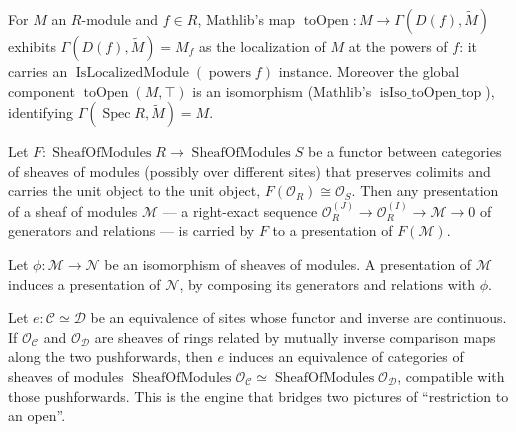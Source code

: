 \begin{lemma}
  \label{mk-lem:tilde_toOpen_isLocalizedModule_mathlib}
  \mathlibok

  For \(M\) an \(R\)-module and \(f \in R\), Mathlib's map
  \(\operatorname{toOpen} : M \to \Gamma(D(f), \widetilde{M})\) exhibits \(\Gamma(D(f), \widetilde{M}) =
  M_f\) as the localization of \(M\) at the powers of \(f\): it carries an
  \(\operatorname{IsLocalizedModule}(\operatorname{powers} f)\) instance. Moreover the global component
  \(\operatorname{toOpen}(M, \top)\) is an isomorphism (Mathlib's
  \(\operatorname{isIso\_toOpen\_top}\)), identifying \(\Gamma(\operatorname{Spec} R, \widetilde{M}) =
  M\).
\end{lemma}

\begin{lemma}
  \label{mk-lem:presentation_map_mathlib}
  \mathlibok

  Let \(F : \operatorname{SheafOfModules} R \to \operatorname{SheafOfModules} S\) be a functor between
  categories of sheaves of modules (possibly over different sites) that preserves colimits and carries
  the unit object to the unit object, \(F(\mathcal{O}_R) \cong \mathcal{O}_S\). Then any presentation
  of a sheaf of modules \(\mathcal{M}\) — a right-exact sequence
  \(\mathcal{O}_R^{(J)} \to \mathcal{O}_R^{(I)} \to \mathcal{M} \to 0\) of generators and relations —
  is carried by \(F\) to a presentation of \(F(\mathcal{M})\).
\end{lemma}

\begin{lemma}
  \label{mk-lem:presentation_ofIsIso_mathlib}
  \mathlibok

  Let \(\phi : \mathcal{M} \to \mathcal{N}\) be an isomorphism of sheaves of modules. A presentation of
  \(\mathcal{M}\) induces a presentation of \(\mathcal{N}\), by composing its generators and relations
  with \(\phi\).
\end{lemma}

\begin{lemma}
  \label{mk-lem:pushforwardPushforwardEquivalence_mathlib}
  \mathlibok

  Let \(e : \mathcal{C} \simeq \mathcal{D}\) be an equivalence of sites whose functor and inverse
  are continuous.  If \(\mathcal{O}_{\mathcal{C}}\) and \(\mathcal{O}_{\mathcal{D}}\) are sheaves of
  rings related by mutually inverse comparison maps along the two pushforwards, then \(e\) induces
  an equivalence of categories of sheaves of modules
  \(\operatorname{SheafOfModules} \mathcal{O}_{\mathcal{C}} \simeq
  \operatorname{SheafOfModules} \mathcal{O}_{\mathcal{D}}\), compatible with those pushforwards.
  This is the engine that bridges two pictures of ``restriction to an open''.
\end{lemma}

